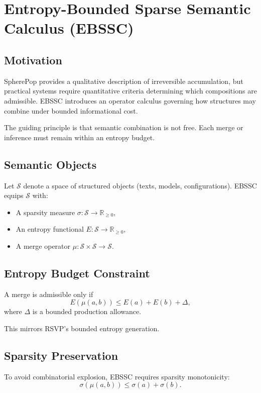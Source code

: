 \documentclass[12pt]{article}
\begin{document}
\section{Entropy-Bounded Sparse Semantic Calculus (EBSSC)}

\subsection{Motivation}

SpherePop provides a qualitative description of irreversible accumulation, but practical systems require quantitative criteria determining which compositions are admissible. EBSSC introduces an operator calculus governing how structures may combine under bounded informational cost.

The guiding principle is that semantic combination is not free. Each merge or inference must remain within an entropy budget.

\subsection{Semantic Objects}

Let $\mathcal{S}$ denote a space of structured objects (texts, models, configurations). EBSSC equips $\mathcal{S}$ with:

\begin{itemize}
\item A sparsity measure $\sigma: \mathcal{S}\to\mathbb{R}_{\ge0}$,
\item An entropy functional $E: \mathcal{S}\to\mathbb{R}_{\ge0}$,
\item A merge operator $\mu: \mathcal{S}\times\mathcal{S}\to\mathcal{S}$.
\end{itemize}

\subsection{Entropy Budget Constraint}

A merge is admissible only if
\[
E(\mu(a,b)) \le E(a)+E(b)+\Delta,
\]
where $\Delta$ is a bounded production allowance.

This mirrors RSVP’s bounded entropy generation.

\subsection{Sparsity Preservation}

To avoid combinatorial explosion, EBSSC requires sparsity monotonicity:
\[
\sigma(\mu(a,b)) \le \sigma(a)+\sigma(b).
\]
\end{document}
